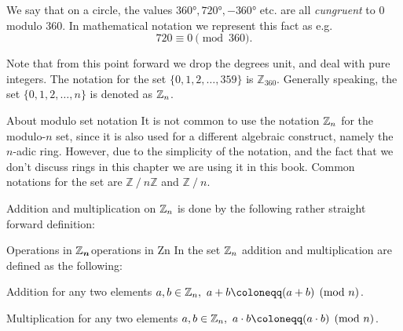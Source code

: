 We say that on a circle, the values $\ang{360}, \ang{720}, -\ang{360}$ etc. are all \emph{cungruent} to $0$ modulo $360$. In mathematical notation we represent this fact as e.g.
\begin{equation}
	720 \equiv 0 \pmod{360}.
	\label{eq:mod 360}
\end{equation}

Note that from this point forward we drop the degrees unit, and deal with pure integers.
The notation for the set $\{0,1,2,\dots,359\}$ is $\mathbb{Z}_{360}$. Generally speaking, the set $\{0,1,2,\dots,n\}$ is denoted as $\mathbb{Z}_{n}$.

\begin{note}{About modulo set notation}{}
	It is not common to use the notation $\mathbb{Z}_{n}$ for the modulo-$n$ set, since it is also used for a different algebraic construct, namely the $n$-adic ring. However, due to the simplicity of the notation, and the fact that we don't discuss rings in this chapter we are using it in this book. Common notations for the set are $\mathbb{Z}\mathbin{/} n\mathbb{Z}$ and $\mathbb{Z}\mathbin{/} n$.
\end{note}

Addition and multiplication on $\mathbb{Z}_{n}$ is done by the following rather straight forward definition:
\begin{definition}{Operations in $\bm{\mathbb{Z}_{n}}$}{operations in Zn}
	In the set $\mathbb{Z}_{n}$ addition and multiplication are defined as the following:
	\begin{descitemize}
	\item[Addition] for any two elements $a,b\in\Z{n},\ a+b\coloneqq(a+b)\pmod{n}$.
	\item[Multiplication] for any two elements $a,b\in\Z{n},\ a\cdot b\coloneqq(a\cdot b)\pmod{n}$.
	\end{descitemize}
\end{definition}

